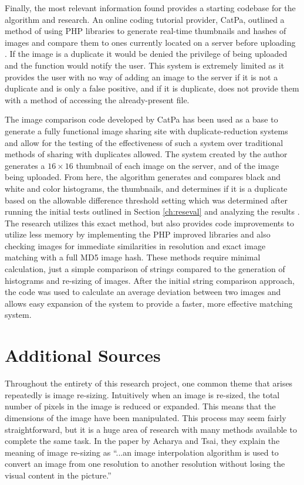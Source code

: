 Finally, the most relevant information found provides a starting codebase for the algorithm and research. An online coding tutorial provider, CatPa, outlined a method of using PHP libraries to generate real-time thumbnails and hashes of images and compare them to ones currently located on a server before uploading \cite{catpa:gdcode}. If the image is a duplicate it would be denied the privilege of being uploaded and the function would notify the user. This system is extremely limited as it provides the user with no way of adding an image to the server if it is not a duplicate and is only a false positive, and if it is duplicate, does not provide them with a method of accessing the already-present file.

The image comparison code developed by CatPa has been used as a base to generate a fully functional image sharing site with duplicate-reduction systems and allow for the testing of the effectiveness of such a system over traditional methods of sharing with duplicates allowed. The system created by the author \cite{catpa:gdcode} generates a $16\times 16$ thumbnail of each image on the server, and of the image being uploaded. From here, the algorithm generates and compares black and white and color histograms, the thumbnails, and determines if it is a duplicate based on the allowable difference threshold setting which was determined after running the initial tests outlined in Section \ref{ch:reseval} and analyzing the results \cite{catpa:gdcode}. The research utilizes this exact method, but also provides code improvements to utilize less memory by implementing the PHP improved libraries and also checking images for immediate similarities in resolution and exact image matching with a full MD5 image hash. These methods require minimal calculation, just a simple comparison of strings compared to the generation of histograms and re-sizing of images. After the initial string comparison approach, the code was used to calculate an average deviation between two images and allows easy expansion of the system to provide a faster, more effective matching system.

\section{Additional Sources}
Throughout the entirety of this research project, one common theme that arises repeatedly is image re-sizing. Intuitively when an image is re-sized, the total number of pixels in the image is reduced or expanded. This means that the dimensions of the image have been manipulated. This process may seem fairly straightforward, but it is a huge area of research with many methods available to complete the same task. In the paper by Acharya and Tsai, they explain the meaning of image re-sizing as ``...an image interpolation algorithm is used to convert an image from one resolution to another resolution without losing the visual content in the picture.'' \cite{Acharya:2007}

